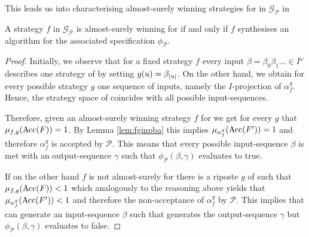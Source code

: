 This leads us into characterising almost-surely winning strategies for \eve{} 
in $\mathcal{G}_{\mathcal{P}}$ in
\begin{lemma}
  A strategy $f$ in $\mathcal{G}_{\mathcal{P}}$ is almost-surely winning for
  \eve{} if and only if $f$ synthesises an algorithm for the associated 
  specification $\phi_{\mathcal{P}}$.
\end{lemma}
\begin{proof}
  Initially, we observe that for a fixed strategy $f$ every input
  $\beta = \beta_{0}\beta_{1}\dots\in I^{\omega}$ describes one strategy of 
  \adam{} by setting $g(u) = \beta_{\left\vert{u}\right\vert}$. On the other hand, we obtain
  for every possible strategy $g$ one sequence of inputs, namely the 
  $I$-projection of $\alpha_{f}^{g}$. Hence, the strategy space of \adam{}
  coincides with all possible input-sequences. 

  Therefore, given an almost-surely winning strategy $f$ for \eve{} we get 
  for every $g$ that $\mu_{f,g}(\operatorname{Acc}(F)) = 1$. By Lemma \ref{lem:fginpba} 
  this implies $\mu_{\alpha_{f}^{g}}(\operatorname{Acc}(F')) = 1$ and therefore 
  $\alpha_{f}^{g}$ is accepted by $\mathcal{P}$. This means that every 
  possible input-sequence $\beta$ is met with an output-sequence $\gamma$ 
  such that $\phi_{\mathcal{P}}(\beta, \gamma)$ evaluates to true.

  If on the other hand $f$ is not almost-surely for \eve{} there is a riposte 
  $g$ of \adam{} such that $\mu_{f,g}(\operatorname{Acc}(F)) < 1$ which analogously to the 
  reasoning above yields that $\mu_{\alpha_{f}^{g}}(\operatorname{Acc}(F')) < 1$ and 
  therefore the non-acceptance of $\alpha_{f}^{g}$ by $\mathcal{P}$. 
  This implies that \adam{} can generate an input-sequence $\beta$ such that 
  \eve{} generates the output-sequence $\gamma$ but 
  $\phi_{\mathcal{P}}(\beta, \gamma)$ evaluates to false.
\end{proof}

